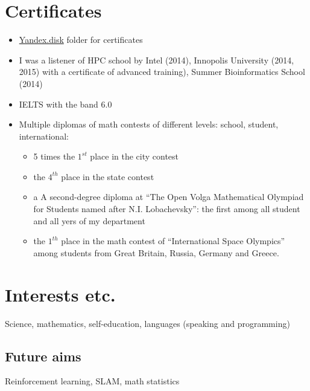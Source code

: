 \documentclass[letterpaper]{twentysecondcv} %
\begin{document}
\section{Certificates}
    {\begin{itemize}
        \item \href{https://yadi.sk/d/aSyzcZ44-_l-8w?w=1}{Yandex.disk} folder for certificates
        \item I was a listener of HPC school by Intel (2014), Innopolis University (2014, 2015) with a certificate of advanced training),
        Summer Bioinformatics School (2014)
        \item IELTS with the band 6.0
        \item Multiple diplomas of math contests of different levels: school, student, international:
            {\begin{itemize}
            \item 5 times the $1^{st}$ place in the city contest
            \item the $4^{th}$ place in the state contest
            \item a A second-degree diploma at ``The Open Volga Mathematical Olympiad for Students named after N.I. Lobachevsky'': the first among all student and all yers of my department
            \item the $1^{th}$ place in the math contest of ``International Space Olympics'' among students from Great Britain, Russia, Germany and Greece.
            \end{itemize}}

    \end{itemize}}

\section{Interests etc.}

Science, mathematics, self-education, languages (speaking and programming)

\subsection{Future aims}

Reinforcement learning, SLAM, math statistics


\end{document}
